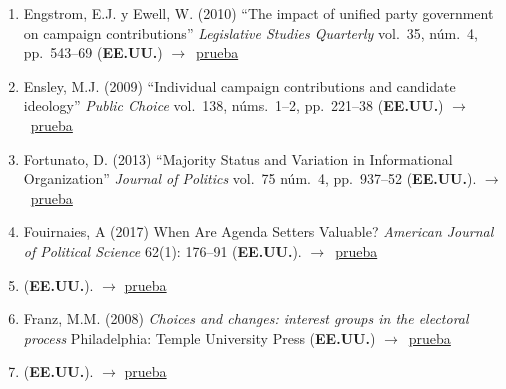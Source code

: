 \documentclass[12 pt, letter]{article}
\newenvironment{CitasMiTrabajo}{
    \begin{footnotesize}
    \begin{enumerate}[label={\footnotesize\emph{cita~\arabic*}},ref=\arabic*] %
        \setlength{\itemsep}{.1\itemsep}
        \setlength{\parskip}{.1\parskip}
    }{\end{enumerate}\end{footnotesize}}
\begin{document}
\begin{CitasMiTrabajo}
        \item Engstrom, E.J. y Ewell, W. (2010)
        ``The impact of unified party government on campaign contributions'' \emph{Legislative Studies Quarterly} vol.\ 35, n\'um.\ 4, pp.\ 543--69 (\textbf{EE.UU.}) $\rightarrow$~\href{https://github.com/emagar/cv/blob/master/citasMiTrab/coxMagar/eng.pdf}{prueba}

        \item Ensley, M.J. (2009)
        ``Individual campaign contributions and
        candidate ideology'' \emph{Public Choice} vol.\ 138, n\'ums.\
        1--2, pp.\ 221--38  (\textbf{EE.UU.}) $\rightarrow$~\href{https://github.com/emagar/cv/blob/master/citasMiTrab/coxMagar/ensley.pdf}{prueba}

        \item Fortunato, D. (2013)
        ``Majority Status and Variation in Informational Organization''
        \emph{Journal of Politics} vol.\ 75 n\'um.\ 4, pp.\ 937--52 (\textbf{EE.UU.}). $\rightarrow$~\href{https://github.com/emagar/cv/blob/master/citasMiTrab/coxMagar/fortunato2013majority.pdf}{prueba}

       \item Fouirnaies, A (2017) When Are Agenda Setters Valuable? \emph{American Journal of Political Science} 62(1): 176--91  (\textbf{EE.UU.}).  $\rightarrow$~\href{https://www.semanticscholar.org/paper/When-Are-Agenda-Setters-Valuable-Fouirnaies/0d678dfce6af4687df2afab1a34823f2e1f140c9#references}{prueba}
         
       \item {} (\textbf{EE.UU.}).  $\rightarrow$ \href{https://www.semanticscholar.org/paper/How-Do-Interest-Groups-Seek-Access-to-Committees-Fouirnaies-Hall/24bd4967d82425253781f2839f43f565c6fa792b}{prueba}
         
        \item Franz, M.M. (2008)
        \emph{Choices and changes:
        interest groups in the electoral process}
        Philadelphia: Temple University Press (\textbf{EE.UU.}) $\rightarrow$~\href{https://github.com/emagar/cv/blob/master/citasMiTrab/coxMagar/franz.pdf}{prueba}

        \item {} (\textbf{EE.UU.}).  $\rightarrow$ \href{https://www.jstor.org/stable/pdf/43495452.pdf?casa_token=ErTU6QC2C9gAAAAA:yyTvPo0PtAbRU5YfTluu7NqrgxCxVuw-6GxCDLu5U-sPmOSLf_MMzSULxzOJ1IoRhhmQkowqyNRRjhbHeXnDC6NJO_Yt5BQ8aXhrp59Zsl2VIUHm_20}{prueba}


\end{CitasMiTrabajo}
\end{document}
